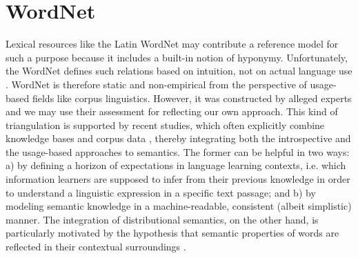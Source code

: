 \documentclass[oneside]{book}
\begin{document}
\section{WordNet}
\label{WordNet}
Lexical resources like the Latin WordNet \parencite{minozziLatinWordNetProject2010} may contribute a reference model for such a purpose because it includes a built-in notion of hyponymy. Unfortunately, the WordNet defines such relations based on intuition, not on actual language use \parencite[315]{fellbaumChallengesMultilingualWordnet2012}. WordNet is therefore static and non-empirical from the perspective of usage-based fields like corpus linguistics. However, it was constructed by alleged experts and we may use their assessment for reflecting our own approach. This kind of triangulation is supported by recent studies, which often explicitly combine knowledge bases and corpus data \parencite[984-988]{onoWordEmbeddingbasedAntonym2015}, thereby integrating both the introspective and the usage-based approaches to semantics. The former can be helpful in two ways: a) by defining a horizon of expectations in language learning contexts, i.e. which information learners are supposed to infer from their previous knowledge in order to understand a linguistic expression in a specific text passage; and b) by modeling semantic knowledge in a machine-readable, consistent (albeit simplistic) manner. The integration of distributional semantics, on the other hand, is particularly motivated by the hypothesis that semantic properties of words are reflected in their contextual surroundings \parencite[59]{griesBehavioralProfilesCorpusbased2009}. 
\end{document}
